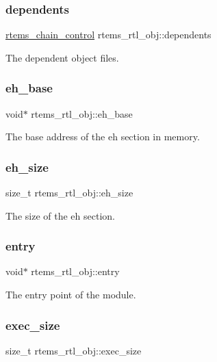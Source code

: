 \subsubsection{\texorpdfstring{dependents}{dependents}}
{\footnotesize\ttfamily \mbox{\hyperlink{unionChain__Control}{rtems\+\_\+chain\+\_\+control}} rtems\+\_\+rtl\+\_\+obj\+::dependents}

The dependent object files. \mbox{\label{structrtems__rtl__obj_ac2264e0c5116ff34096b0531633dfceb}} 
\subsubsection{\texorpdfstring{eh\_base}{eh\_base}}
{\footnotesize\ttfamily void$\ast$ rtems\+\_\+rtl\+\_\+obj\+::eh\+\_\+base}

The base address of the eh section in memory. \mbox{\label{structrtems__rtl__obj_a3a13727ccb574ea55b2e8af43bacda12}} 
\subsubsection{\texorpdfstring{eh\_size}{eh\_size}}
{\footnotesize\ttfamily size\+\_\+t rtems\+\_\+rtl\+\_\+obj\+::eh\+\_\+size}

The size of the eh section. \mbox{\label{structrtems__rtl__obj_a627c539d0bcb65c4f21dbc60e6b8f29b}} 
\subsubsection{\texorpdfstring{entry}{entry}}
{\footnotesize\ttfamily void$\ast$ rtems\+\_\+rtl\+\_\+obj\+::entry}

The entry point of the module. \mbox{\label{structrtems__rtl__obj_ac7576e17b37ec5daf15098d5db5a5292}} 
\subsubsection{\texorpdfstring{exec\_size}{exec\_size}}
{\footnotesize\ttfamily size\+\_\+t rtems\+\_\+rtl\+\_\+obj\+::exec\+\_\+size}

